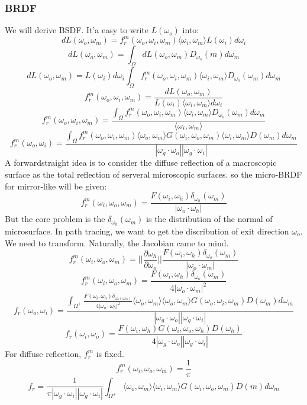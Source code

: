 \documentclass[10pt,a4paper]{article}
\begin{document}
\subsubsection{BRDF}
We will derive BSDF. It'a easy to write $L(\omega_o)$ into:\\
\[dL(\omega_o,\omega_m)=f_r^m(\omega_o,\omega_i,\omega_m)\langle\omega_i,\omega_m\rangle L(\omega_i)d\omega_i\]
\[dL(\omega_o,\omega_m)=\int_{\Omega}dL(\omega_o,\omega_m)D_{\omega_o}(m)d\omega_m\]
\[dL(\omega_o,\omega_m)=L(\omega_i)d\omega_i\int_{\Omega}f_r^m(\omega_o,\omega_i,\omega_m)\langle\omega_i,\omega_m\rangle D_{\omega_o}(\omega_m)d\omega_m\]
\[f_r^m(\omega_o,\omega_i,\omega_m)=\frac{dL(\omega_o,\omega_m)}{L(\omega_i)\langle\omega_i,\omega_m\rangle d\omega_i}\]
\[f_r^m(\omega_o,\omega_i,\omega_m)=\frac{\int_{\Omega}f_r^m(\omega_o,\omega_i,\omega_m)\langle\omega_i,\omega_m\rangle D_{\omega_o}(\omega_m)d\omega_m}{\langle\omega_i,\omega_m\rangle}\]
\[f_r^m(\omega_o,\omega_i)=\frac{\int_{\Omega}f_r^m(\omega_o,\omega_i,\omega_m)\langle\omega_o,\omega_m\rangle G(\omega_i,\omega_o,\omega_m)\langle\omega_i,\omega_m\rangle D(\omega_m)d\omega_m}{|\omega_g\cdot\omega_o||\omega_g\cdot\omega_i|}\]
A forwardstraight idea is to consider the diffuse reflection of a macroscopic surface as the total reflection of serveral microscopic surfaces.
so the micro-BRDF for mirror-like will be given:
\[f_r^m(\omega_i,\omega_o,\omega_m)=\frac{F(\omega_i,\omega_h)\delta_{\omega_h}(\omega_m)}{|\omega_o\cdot\omega_h|}\]
But the core problem is the $\delta_{\omega_h}(\omega_m)$ is the distribution of the normal of microsurface. In path tracing, we want to get the discribution of exit direction $\omega_o$.
We need to transform. Naturally, the Jacobian came to mind.
\[f_r^m(\omega_i,\omega_o,\omega_m)=||\frac{\partial\omega_h}{\partial\omega_o}||\frac{F(\omega_i,\omega_h)\delta_{\omega_o}(\omega_m)}{|\omega_o\cdot\omega_m|}\]
\[f_r^m(\omega_i,\omega_o,\omega_m)=\frac{F(\omega_i,\omega_h)\delta_{\omega_o}(\omega_m)}{4|\omega_o\cdot\omega_m|^2}\]
\[f_r(\omega_o,\omega_i)=\frac{\int_{\Omega^+}\frac{F(\omega_i,\omega_h)\delta_{\omega_o(\omega_m)}}{4|\omega_o\cdot\omega_h|^2}
\langle\omega_o,\omega_m\rangle\langle\omega_o,\omega_m\rangle G(\omega_o,\omega_i,\omega_m)D(\omega_m)d\omega_m}{|\omega_g\cdot\omega_o||\omega_g\cdot\omega_i|}\]
\[f_r(\omega_i,\omega_o)=\frac{F(\omega_i,\omega_h)G(\omega_i,\omega_o,\omega_h)D(\omega_h)}{4|\omega_g\cdot\omega_o||\omega_g\cdot\omega_i|}\]
For diffuse reflection, $f_r^m$ is fixed.
\[f_r^m(\omega_i,\omega_o,\omega_m)=\frac{1}{\pi}\]
\[f_r=\frac{1}{\pi|\omega_g\cdot\omega_i||\omega_g\cdot\omega_i|}\int_{\Omega^+}\langle\omega_o,\omega_m\rangle\langle\omega_i,\omega_m\rangle G(\omega_i,\omega_o,\omega_m)D(m)d\omega_m\]
\end{document}
